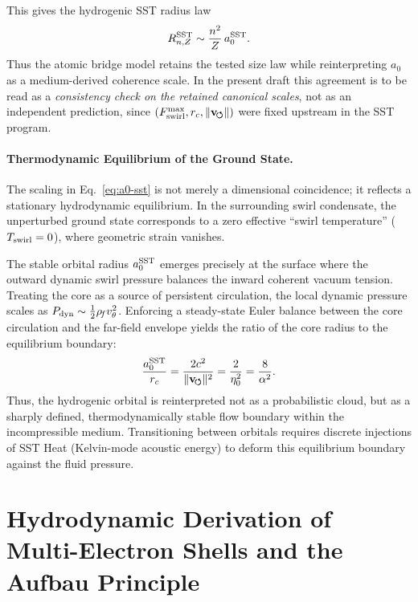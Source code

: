 \documentclass[11pt,a4paper]{article}
\newcommand{\rc}{r_c}
\newcommand{\rhoF}{\rho_{\!f}}
\begin{document}
This gives the hydrogenic SST radius law
\begin{equation}
\label{eq:RnZ}
R_{n,Z}^{\rm SST}\sim \frac{n^2}{Z}\,a_0^{\rm SST}.
\end{equation}
Thus the atomic bridge model retains the tested size law while reinterpreting $a_0$ as a medium-derived coherence scale. In the present draft this agreement is to be read as a \emph{consistency check on the retained canonical scales}, not as an independent prediction, since $(F_{\rm swirl}^{\max},\rc,\lVert\mathbf{v}_{\!\boldsymbol{\circlearrowleft}}\rVert)$ were fixed upstream in the SST program.

\paragraph{Thermodynamic Equilibrium of the Ground State.}
The scaling in Eq.~\eqref{eq:a0-sst} is not merely a dimensional coincidence; it reflects a stationary hydrodynamic equilibrium. In the surrounding swirl condensate, the unperturbed ground state corresponds to a zero effective ``swirl temperature'' ($T_{\rm swirl} = 0$), where geometric strain vanishes.

The stable orbital radius $a_0^{\rm SST}$ emerges precisely at the surface where the outward dynamic swirl pressure balances the inward coherent vacuum tension. Treating the core as a source of persistent circulation, the local dynamic pressure scales as $P_{\rm dyn} \sim \frac{1}{2}\rhoF v_\theta^2$. Enforcing a steady-state Euler balance between the core circulation and the far-field envelope yields the ratio of the core radius to the equilibrium boundary:
\begin{equation}
\label{eq:PressureBalance}
\frac{a_0^{\rm SST}}{\rc} = \frac{2c^2}{\lVert \mathbf{v}_{\!\boldsymbol{\circlearrowleft}}\rVert^2} = \frac{2}{\eta_0^2} = \frac{8}{\alpha^2}.
\end{equation}
Thus, the hydrogenic orbital is reinterpreted not as a probabilistic cloud, but as a sharply defined, thermodynamically stable flow boundary within the incompressible medium. Transitioning between orbitals requires discrete injections of SST Heat (Kelvin-mode acoustic energy) to deform this equilibrium boundary against the fluid pressure.

\section{Hydrodynamic Derivation of Multi-Electron Shells and the Aufbau Principle}
\label{sec:MultiElectronShells}
\end{document}
